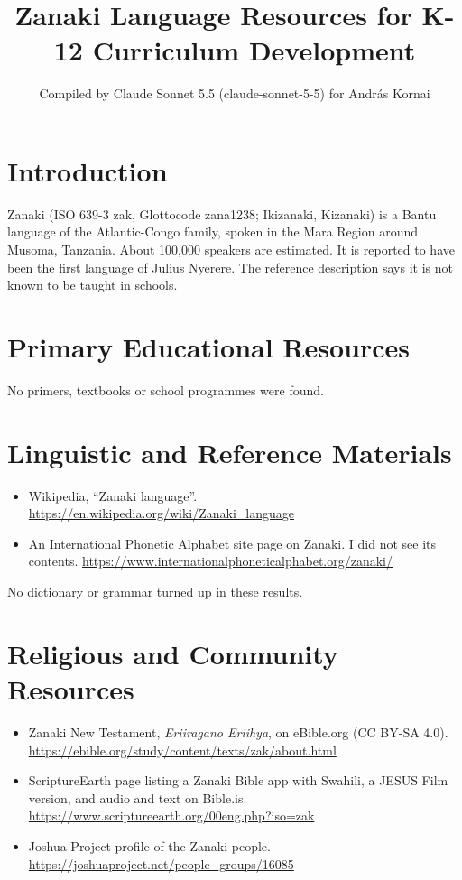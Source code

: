 \documentclass[12pt]{article}
\title{Zanaki Language Resources for K-12 Curriculum Development}
\author{Compiled by Claude Sonnet 5.5 (claude-sonnet-5-5) for Andr\'as Kornai}
\date{}
\begin{document}
\maketitle

\section{Introduction}
Zanaki (ISO 639-3 zak, Glottocode zana1238; Ikizanaki, Kizanaki) is a Bantu language of the Atlantic-Congo family, spoken in the Mara Region around Musoma, Tanzania. About 100,000 speakers are estimated. It is reported to have been the first language of Julius Nyerere. The reference description says it is not known to be taught in schools.

\section{Primary Educational Resources}
No primers, textbooks or school programmes were found.

\section{Linguistic and Reference Materials}
\begin{itemize}
\item Wikipedia, ``Zanaki language''. \url{https://en.wikipedia.org/wiki/Zanaki_language}
\item An International Phonetic Alphabet site page on Zanaki. I did not see its contents. \url{https://www.internationalphoneticalphabet.org/zanaki/}
\end{itemize}
No dictionary or grammar turned up in these results.

\section{Religious and Community Resources}
\begin{itemize}
\item Zanaki New Testament, \emph{Eriiragano Eriihya}, on eBible.org (CC BY-SA 4.0). \url{https://ebible.org/study/content/texts/zak/about.html}
\item ScriptureEarth page listing a Zanaki Bible app with Swahili, a JESUS Film version, and audio and text on Bible.is. \url{https://www.scriptureearth.org/00eng.php?iso=zak}
\item Joshua Project profile of the Zanaki people. \url{https://joshuaproject.net/people_groups/16085}
\end{itemize}
\end{document}
